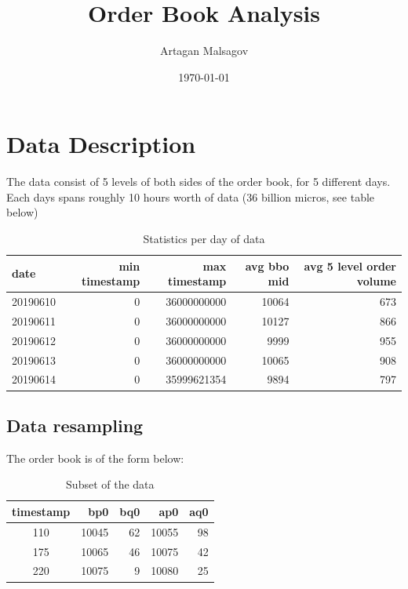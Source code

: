 \documentclass[english, 11pt, a4paper]{article}
\begin{document}
\baselineskip18pt


\title{Order Book Analysis}

\author{Artagan Malsagov}

\date{\today}


\maketitle


\section{Data Description}

The data consist of 5 levels of both sides of the order book, for 5 different days.
Each days spans roughly 10 hours worth of data (36 billion micros, see table below)

\begin{table}[H]
    \centering
    \begin{tabular}{lrrrr}
    \toprule
    date & min timestamp & max timestamp & avg bbo mid & avg 5 level order volume \\
    \midrule
    20190610 & 0 & 36000000000 & 10064 & 673 \\
    20190611 & 0 & 36000000000 & 10127 & 866 \\
    20190612 & 0 & 36000000000 & 9999 & 955 \\
    20190613 & 0 & 36000000000 & 10065 & 908 \\
    20190614 & 0 & 35999621354 & 9894 & 797 \\
    \bottomrule
    \end{tabular}
    \caption{Statistics per day of data}
    \label{tab2}
\end{table}


\subsection{Data resampling}
The order book is of the form below:

\begin{table}[H]
    \centering
    \begin{tabular}{crrrr}
    \toprule
    timestamp & bp0 & bq0 & ap0 & aq0 \\
    \midrule
    110 & 10045& 62 & 10055 & 98 \\
    175 & 10065& 46 & 10075 & 42 \\
    220 & 10075& 9 & 10080 & 25 \\
    \bottomrule
    \end{tabular}
    \caption{Subset of the data}
    \label{tab2}
\end{table}
\end{document}
